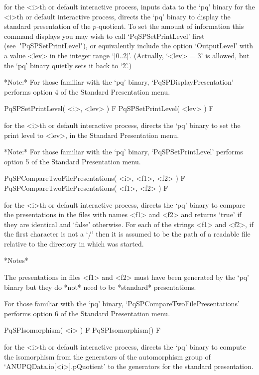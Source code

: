 for the <i>th or default interactive {\ANUPQ} process, inputs data to the
`pq' binary for  the  <i>th  or  default  interactive  {\ANUPQ}  process,
directs the `pq' binary to  display  the  standard  presentation  of  the
$p$-quotient. To set the amount of information this command displays  you
may wish to call `PqSPSetPrintLevel' first (see~"PqSPSetPrintLevel"),  or
equivalently include the option `OutputLevel' with a value <lev>  in  the
integer range `[0..2]'. (Actually, `<lev> = 3' is allowed, but  the  `pq'
binary quietly sets it back to `2'.)

*Note:*
For  those  familiar  with  the  `pq'  binary,  `PqSPDisplayPresentation'
performs option 4 of the Standard Presentation menu.

\>PqSPSetPrintLevel( <i>, <lev> ) F
\>PqSPSetPrintLevel( <lev> ) F

for the <i>th or default interactive {\ANUPQ} process, directs  the  `pq'
binary to set the print level to  <lev>,  in  the  Standard  Presentation
menu.

*Note:* For those familiar  with  the  `pq'  binary,  `PqSPSetPrintLevel'
performs option 5 of the Standard Presentation menu.

\>PqSPCompareTwoFilePresentations( <i>, <f1>, <f2> ) F
\>PqSPCompareTwoFilePresentations( <f1>, <f2> ) F

for the <i>th or default interactive {\ANUPQ} process, directs  the  `pq'
binary to compare the presentations in the files with names <f1> and <f2>
and returns `true' if they are identical and `false' otherwise. For  each
of the strings <f1> and <f2>, if the first character is not a `/' then it
is assumed to be the path of a readable file relative to the directory in
which {\GAP} was started.

*Notes*

The presentations in files <f1> and <f2> must have been generated by  the
`pq' binary but they do *not* need to be *standard* presentations.

For      those      familiar      with      the       `pq'       binary,
`PqSPCompareTwoFilePresentations' performs  option  6  of  the  Standard
Presentation menu.

\>PqSPIsomorphism( <i> ) F
\>PqSPIsomorphism() F

for the <i>th or default interactive {\ANUPQ} process, directs  the  `pq'
binary to compute the isomorphism from the generators of the automorphism
group of `ANUPQData.io[<i>].pQuotient' to the generators for the standard
presentation.

